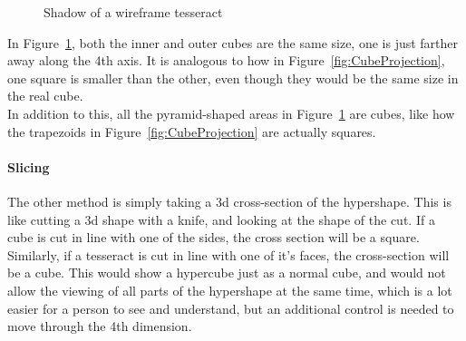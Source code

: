 \documentclass[12pt]{article}
\begin{document}
\begin{figure}
    \centering
    \caption{Shadow of a wireframe tesseract}\label{fig:TesseractProjection}
\end{figure}

In Figure~\ref{fig:TesseractProjection}, both the inner and outer cubes are the same size, one is just farther away along the 4th axis.
It is analogous to how in Figure~\ref{fig:CubeProjection}, one square is smaller than the other, even though they would be the same size in the real cube.\\
In addition to this, all the pyramid-shaped areas in Figure~\ref{fig:TesseractProjection} are cubes, like how the trapezoids in Figure~\ref{fig:CubeProjection} are actually squares.

\paragraph{Slicing}
The other method is simply taking a 3d cross-section of the hypershape. This is like cutting a 3d shape with a knife, and looking at the shape of the cut.
If a cube is cut in line with one of the sides, the cross section will be a square.
Similarly, if a tesseract is cut in line with one of it's faces, the cross-section will be a cube.
This would show a hypercube just as a normal cube, and would not allow the viewing of all parts of the hypershape at the same time, which is a lot easier for a person to see and understand, but an additional control is needed to move through the 4th dimension.
\end{document}
